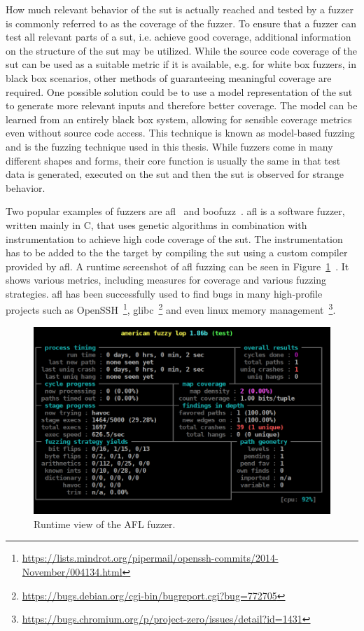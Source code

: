How much relevant behavior of the \ac{sut} is actually reached and tested by a fuzzer is commonly referred to as the coverage of the fuzzer. To ensure that a fuzzer can test all relevant parts of a \ac{sut}, i.e. achieve good coverage, additional information on the structure of the \ac{sut} may be utilized. While the source code coverage of the \ac{sut} can be used as a suitable metric if it is available, e.g. for white box fuzzers, in black box scenarios, other methods of guaranteeing meaningful coverage are required. One possible solution could be to use a model representation of the \ac{sut} to generate more relevant inputs and therefore better coverage. The model can be learned from an entirely black box system, allowing for sensible coverage metrics even without source code access. This technique is known as model-based fuzzing and is the fuzzing technique used in this thesis. While fuzzers come in many different shapes and forms, their core function is usually the same in that test data is generated, executed on the \ac{sut} and then the \ac{sut} is observed for strange behavior.

Two popular examples of fuzzers are \ac{afl}~\cite{zalewskiafl} and boofuzz~\cite{pereyda2019boofuzz}. \ac{afl} is a software fuzzer, written mainly in C, that uses genetic algorithms in combination with instrumentation to achieve high code coverage of the \Ac{sut}. The instrumentation has to be added to the the target by compiling the \ac{sut} using a custom compiler provided by \ac{afl}. A runtime screenshot of \ac{afl} fuzzing can be seen in Figure~\ref{fig:americanfuzzylopsafl-fuzzrunningonatestprogram}~\cite{pict}. It shows various metrics, including measures for coverage and various fuzzing strategies. \ac{afl} has been successfully used to find bugs in many high-profile projects such as OpenSSH~\footnote{\url{https://lists.mindrot.org/pipermail/openssh-commits/2014-November/004134.html}}, glibc~\footnote{\url{https://bugs.debian.org/cgi-bin/bugreport.cgi?bug=772705}} and even linux memory management~\footnote{\url{https://bugs.chromium.org/p/project-zero/issues/detail?id=1431}}. 

\begin{figure}
	\centering
	\includegraphics[width=0.9\linewidth]{images/American_fuzzy_lop's_afl-fuzz_running_on_a_test_program}
	\caption{Runtime view of the AFL fuzzer.}
	\label{fig:americanfuzzylopsafl-fuzzrunningonatestprogram}
\end{figure}

